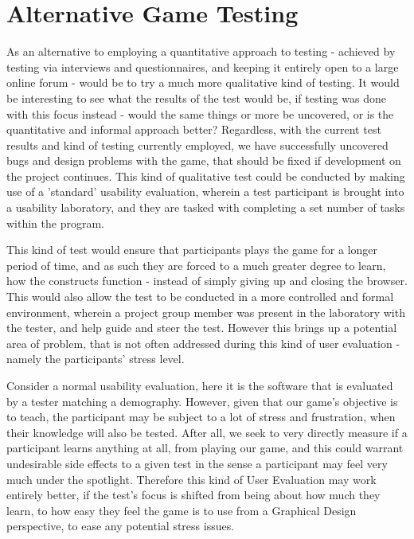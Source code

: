 \section{Alternative Game Testing}

As an alternative to employing a quantitative approach to testing - achieved by testing via interviews and questionnaires, and keeping it entirely open to a large online forum - would be to try a much more qualitative kind of testing. It would be interesting to see what the results of the test would be, if testing was done with this focus instead - would the same things or more be uncovered, or is the quantitative and informal approach better? Regardless, with the current test results and kind of testing currently employed, we have successfully uncovered bugs and design problems with the game, that should be fixed if development on the project continues. This kind of qualitative test could be conducted by making use of a 'standard' usability evaluation, wherein a test participant is brought into a usability laboratory, and they are tasked with completing a set number of tasks within the program. 


This kind of test would ensure that participants plays the game for a longer period of time, and as such they are forced to a much greater degree to learn, how the constructs function - instead of simply giving up and closing the browser. This would also allow the test to be conducted in a more controlled and formal environment, wherein a project group member was present in the laboratory with the tester, and help guide and steer the test. However this brings up a potential area of problem, that is not often addressed during this kind of user evaluation - namely the participants' stress level. 


Consider a normal usability evaluation, here it is the software that is evaluated by a tester matching a demography. However, given that our game's objective is to teach, the participant may be subject to a lot of stress and frustration, when their knowledge will also be tested. After all, we seek to very directly measure if a participant learns anything at all, from playing our game, and this could warrant undesirable side effects to a given test in the sense a participant may feel very much under the spotlight. Therefore this kind of User Evaluation may work entirely better, if the test's focus is shifted from being about how much they learn, to how easy they feel the game is to use from a Graphical Design perspective, to ease any potential stress issues.